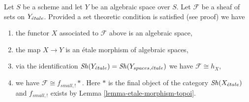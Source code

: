 \begin{lemma}
\label{lemma-sheaf-gives-space}
Let $S$ be a scheme and let $Y$ be an algebraic space over $S$.
Let $\mathcal{F}$ be a sheaf of sets on $Y_{\acute{e}tale}$.
Provided a set theoretic condition is satisfied (see proof) we have
\begin{enumerate}
\item the functor $X$ associated to $\mathcal{F}$ above is an
algebraic space,
\item the map $X \to Y$ is an \'etale morphism of algebraic spaces,
\item via the identification $\mathop{\mathit{Sh}}\nolimits(Y_{\acute{e}tale}) = \mathop{\mathit{Sh}}\nolimits(Y_{spaces, {\acute{e}tale}})$
we have $\mathcal{F} \cong h_X$,
\item we have $\mathcal{F} \cong f_{small, !}*$. Here $*$ is the final object
of the category $\mathop{\mathit{Sh}}\nolimits(X_{\acute{e}tale})$ and $f_{small, !}$ exists by
Lemma \ref{lemma-etale-morphism-topoi}.
\end{enumerate}
\end{lemma}

